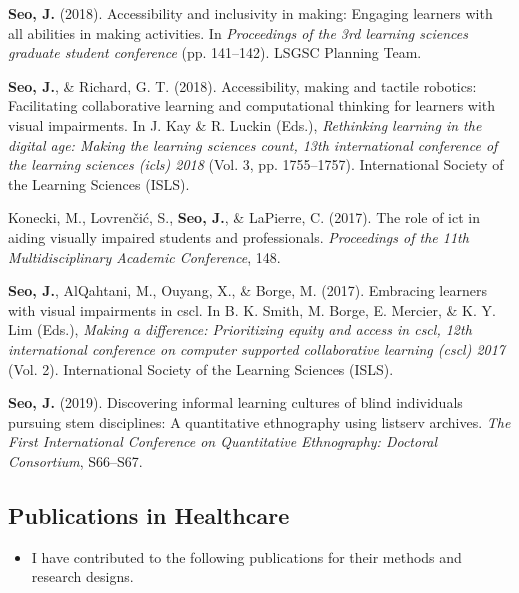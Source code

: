 \documentclass[11pt, a4paper]{awesome-cv}
\providecommand{\tightlist}{%
	\setlength{\itemsep}{0pt}\setlength{\parskip}{0pt}}
\begin{document}
\leavevmode\hypertarget{ref-seo2018making}{}%
\textbf{Seo, J.} (2018). Accessibility and inclusivity in making: Engaging learners with all abilities in making activities. In \emph{Proceedings of the 3rd learning sciences graduate student conference} (pp. 141--142). LSGSC Planning Team.

\leavevmode\hypertarget{ref-seo2018accessibility}{}%
\textbf{Seo, J.}, \& Richard, G. T. (2018). Accessibility, making and tactile robotics: Facilitating collaborative learning and computational thinking for learners with visual impairments. In J. Kay \& R. Luckin (Eds.), \emph{Rethinking learning in the digital age: Making the learning sciences count, 13th international conference of the learning sciences (icls) 2018} (Vol. 3, pp. 1755--1757). International Society of the Learning Sciences (ISLS).

\leavevmode\hypertarget{ref-konecki2017role}{}%
Konecki, M., Lovrenčić, S., \textbf{Seo, J.}, \& LaPierre, C. (2017). The role of ict in aiding visually impaired students and professionals. \emph{Proceedings of the 11th Multidisciplinary Academic Conference}, 148.

\leavevmode\hypertarget{ref-seo2017embracing}{}%
\textbf{Seo, J.}, AlQahtani, M., Ouyang, X., \& Borge, M. (2017). Embracing learners with visual impairments in cscl. In B. K. Smith, M. Borge, E. Mercier, \& K. Y. Lim (Eds.), \emph{Making a difference: Prioritizing equity and access in cscl, 12th international conference on computer supported collaborative learning (cscl) 2017} (Vol. 2). International Society of the Learning Sciences (ISLS).

\leavevmode\hypertarget{ref-seo2019discovering}{}%
\textbf{Seo, J.} (2019). Discovering informal learning cultures of blind individuals pursuing stem disciplines: A quantitative ethnography using listserv archives. \emph{The First International Conference on Quantitative Ethnography: Doctoral Consortium}, S66--S67.

\endgroup

\hypertarget{publications-in-healthcare}{%
\subsection{Publications in Healthcare}\label{publications-in-healthcare}}

\begin{itemize}
\tightlist
\item
  I have contributed to the following publications for their methods and research designs.
\end{itemize}
\end{document}
